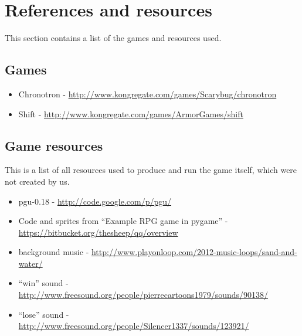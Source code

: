 \section{References and resources}
This section contains a list of the games and resources used.

\subsection{Games}

\begin{itemize}
\item Chronotron - \url{http://www.kongregate.com/games/Scarybug/chronotron}
\item Shift - \url{http://www.kongregate.com/games/ArmorGames/shift}
\end{itemize}

\subsection{Game resources}
This is a list of all resources used to produce and run the game
itself, which were not created by us.

\begin{itemize}
\item pgu-0.18 - \url{http://code.google.com/p/pgu/}
\item Code and sprites from ``Example RPG game in pygame'' - \url{https://bitbucket.org/thesheep/qq/overview}
\item background music - \url{http://www.playonloop.com/2012-music-loops/sand-and-water/}
\item ``win'' sound - \url{http://www.freesound.org/people/pierrecartoons1979/sounds/90138/}
\item ``lose'' sound - \url{http://www.freesound.org/people/Silencer1337/sounds/123921/}
\end{itemize}



